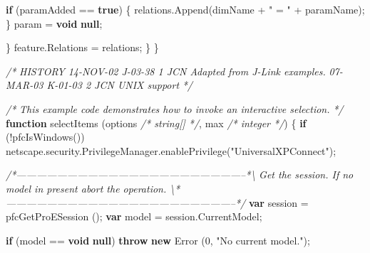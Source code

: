 \documentclass[]{article}
\newenvironment{Shaded}{}{}
\newcommand{\KeywordTok}[1]{\textcolor[rgb]{0.00,0.44,0.13}{\textbf{{#1}}}}
\newcommand{\DecValTok}[1]{\textcolor[rgb]{0.25,0.63,0.44}{{#1}}}
\newcommand{\StringTok}[1]{\textcolor[rgb]{0.25,0.44,0.63}{{#1}}}
\newcommand{\CommentTok}[1]{\textcolor[rgb]{0.38,0.63,0.69}{\textit{{#1}}}}
\newcommand{\OtherTok}[1]{\textcolor[rgb]{0.00,0.44,0.13}{{#1}}}
\newcommand{\FunctionTok}[1]{\textcolor[rgb]{0.02,0.16,0.49}{{#1}}}
\newcommand{\NormalTok}[1]{{#1}}
\begin{document}
\begin{Shaded}
\begin{Highlighting}[]
          \KeywordTok{if} \NormalTok{(paramAdded == }\KeywordTok{true}\NormalTok{)}
          \NormalTok{\{}
              \OtherTok{relations}\NormalTok{.}\FunctionTok{Append}\NormalTok{(dimName + }\StringTok{" = "} \NormalTok{+ paramName);                  }
          \NormalTok{\}}
          \NormalTok{param = }\KeywordTok{void} \KeywordTok{null}\NormalTok{;}
          
      \NormalTok{\}}
     \OtherTok{feature}\NormalTok{.}\FunctionTok{Relations} \NormalTok{= relations;}
  \NormalTok{\}}
\NormalTok{\}         }
    
      
\end{Highlighting}
\end{Shaded}

\begin{Shaded}
\begin{Highlighting}[]
\CommentTok{/*}
\CommentTok{   HISTORY}
\CommentTok{   }
\CommentTok{14-NOV-02   J-03-38   $$1   JCN      Adapted from J-Link examples.}
\CommentTok{07-MAR-03   K-01-03   $$2   JCN      UNIX support}
\CommentTok{*/}
 
\CommentTok{/*}
\CommentTok{  This example code demonstrates how to invoke an interactive selection. }
\CommentTok{*/}
\KeywordTok{function} \FunctionTok{selectItems} \NormalTok{(options }\CommentTok{/* string[] */}\NormalTok{, max }\CommentTok{/* integer */}\NormalTok{)}
\NormalTok{\{}
  \KeywordTok{if} \NormalTok{(!}\FunctionTok{pfcIsWindows}\NormalTok{())}
    \OtherTok{netscape}\NormalTok{.}\OtherTok{security}\NormalTok{.}\OtherTok{PrivilegeManager}\NormalTok{.}\FunctionTok{enablePrivilege}\NormalTok{(}\StringTok{"UniversalXPConnect"}\NormalTok{);}
  
\CommentTok{/*--------------------------------------------------------------------*\textbackslash{} }
\CommentTok{  Get the session. If no model in present abort the operation. }
\CommentTok{\textbackslash{}*--------------------------------------------------------------------*/}  
  \KeywordTok{var} \NormalTok{session = }\FunctionTok{pfcGetProESession} \NormalTok{();}
  \KeywordTok{var} \NormalTok{model = }\OtherTok{session}\NormalTok{.}\FunctionTok{CurrentModel}\NormalTok{;}
  
  \KeywordTok{if} \NormalTok{(model == }\KeywordTok{void} \KeywordTok{null}\NormalTok{)}
    \KeywordTok{throw} \KeywordTok{new} \FunctionTok{Error} \NormalTok{(}\DecValTok{0}\NormalTok{, }\StringTok{"No current model."}\NormalTok{);}
  

\end{Highlighting}
\end{Shaded}
\end{document}
